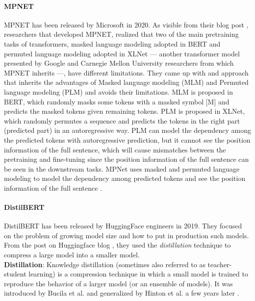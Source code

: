 \documentclass[\main/main.tex]{subfiles}
\begin{document}
\paragraph{MPNET}
MPNET has been released by Microsoft in 2020. As visible from their blog post \cite{mpnet_blog_post},  researchers that developed MPNET, realized that two of the main pretraining tasks of transformers, masked language modeling adopted in BERT and permuted language modeling adopted in XLNet \cite{Yang2019XLNetGA} --- another transformer model presented by Google and Carnegie Mellon University researchers from which MPNET inherits ---, have different limitations. They came up with and approach that inherits the advantages of Masked language modeling (MLM) and Permuted language modeling (PLM) and avoids their limitations. MLM is proposed in BERT, which randomly masks some tokens with a masked symbol [M] and predicts the masked tokens given remaining tokens. PLM is proposed in XLNet, which randomly permutes a sequence and predicts the tokens in the right part (predicted part) in an autoregressive way. PLM can model the dependency among the predicted tokens with autoregressive prediction, but it cannot see the position information of the full sentence, which will cause mismatches between the pretraining and fine-tuning since the position information of the full sentence can be seen in the downstream tasks. MPNet uses masked and permuted language modeling to model the dependency among predicted tokens and see the position information of the full sentence \cite{DBLP:journals/corr/abs-2004-09297}.
\paragraph{DistilBERT}
DistilBERT has been released by HuggingFace engineers in 2019. They focused on the problem of growing model size and how to put in production such models. From the post on Huggingface blog \cite{distilbert_blog_post}, they used the \emph{distillation} technique to compress a large model into a smaller model.\\
\textbf{Distillation}: Knowledge distillation (sometimes also referred to as teacher-student learning) is a compression technique in which a small model is trained to reproduce the behavior of a larger model (or an ensemble of models). It was introduced by Bucila et al. \cite{10.1145/1150402.1150464} and generalized by Hinton et al. \cite{hinton2015distilling} a few years later \cite{DBLP:journals/corr/abs-1910-01108}.
\end{document}
